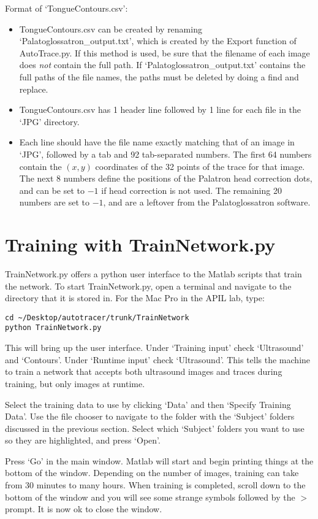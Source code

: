 \documentclass{article}
\begin{document}
\noindent Format of `TongueContours.csv':
\begin{itemize}
	\item TongueContours.csv can be created by renaming `Palatoglossatron\_output.txt', which is created by the Export function of AutoTrace.py. If this method is used, be sure that the filename of each image does \emph{not} contain the full path. If `Palatoglossatron\_output.txt' contains the full paths of the file names, the paths must be deleted by doing a find and replace. 
	\item TongueContours.csv has 1 header line followed by 1 line for each file in the `JPG' directory.
	\item Each line should have the file name exactly matching that of an image in `JPG', followed by a tab and 92 tab-separated numbers. The first 64 numbers contain the $(x, y)$ coordinates of the 32 points of the trace for that image. The next 8 numbers define the positions of the Palatron head correction dots, and can be set to $-1$ if head correction is not used. The remaining 20 numbers are set to $-1$, and are a leftover from the Palatoglossatron software. 
\end{itemize}

\section{Training with TrainNetwork.py}
TrainNetwork.py offers a python user interface to the Matlab scripts that train the network. To start TrainNetwork.py, open a terminal and navigate to the directory that it is stored in. For the Mac Pro in the APIL lab, type:
\begin{verbatim}
cd ~/Desktop/autotracer/trunk/TrainNetwork
python TrainNetwork.py
\end{verbatim}
This will bring up the user interface. Under `Training input' check `Ultrasound' and `Contours'. Under `Runtime input' check `Ultrasound'. This tells the machine to train a network that accepts both ultrasound images and traces during training, but only images at runtime. 

Select the training data to use by clicking `Data' and then `Specify Training Data'. Use the file chooser to navigate to the folder with the `Subject' folders discussed in the previous section. Select which `Subject' folders you want to use so they are highlighted, and press `Open'. 

Press `Go' in the main window. Matlab will start and begin printing things at the bottom of the window. Depending on the number of images, training can take from 30 minutes to many hours. When training is completed, scroll down to the bottom of the window and you will see some strange symbols followed by the $>$ prompt. It is now ok to close the window.
\end{document}
